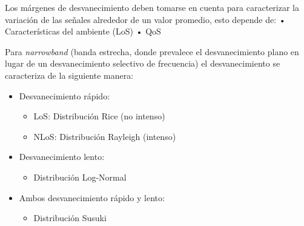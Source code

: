 Los márgenes de desvanecimiento deben tomarse en cuenta para caracterizar la variación de las señales alrededor de un valor promedio, esto depende de:\newline
•	Características del ambiente (LoS)\newline
•	QoS\newline

Para \textit{narrowband} (banda estrecha, donde prevalece el desvanecimiento plano en lugar de un desvanecimiento selectivo de frecuencia) el desvanecimiento se caracteriza de la siguiente manera:
\begin{itemize}
    \item Desvanecimiento rápido:
    \begin{itemize}
        \item LoS: Distribución Rice (no intenso)
        \item NLoS: Distribución Rayleigh (intenso)
    \end{itemize}
    \item Desvanecimiento lento:
    \begin{itemize}
        \item Distribución Log-Normal
    \end{itemize}
    \item Ambos desvanecimiento rápido y lento:
    \begin{itemize}
        \item Distribución Susuki
    \end{itemize}
\end{itemize}


